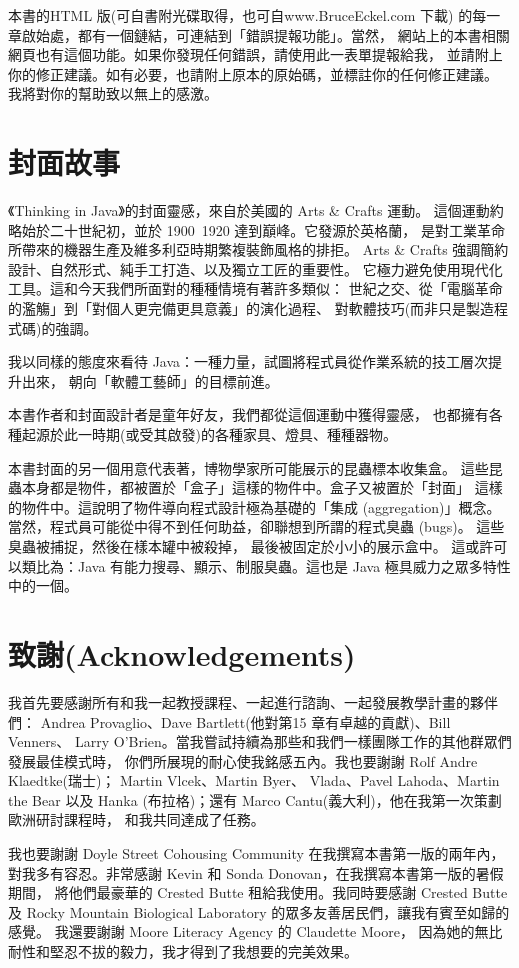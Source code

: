 本書的HTML 版(可自書附光碟取得，也可自www.BruceEckel.com 下載)
的每一章啟始處，都有一個鏈結，可連結到「錯誤提報功能」。當然，
網站上的本書相關網頁也有這個功能。如果你發現任何錯誤，請使用此一表單提報給我，
並請附上你的修正建議。如有必要，也請附上原本的原始碼，並標註你的任何修正建議。
我將對你的幫助致以無上的感激。

\section{封面故事}
《Thinking in Java》的封面靈感，來自於美國的 Arts \& Crafts 運動。
這個運動約略始於二十世紀初，並於 1900~1920 達到巔峰。它發源於英格蘭，
是對工業革命所帶來的機器生產及維多利亞時期繁複裝飾風格的排拒。
Arts \& Crafts 強調簡約設計、自然形式、純手工打造、以及獨立工匠的重要性。
它極力避免使用現代化工具。這和今天我們所面對的種種情境有著許多類似：
世紀之交、從「電腦革命的濫觴」到「對個人更完備更具意義」的演化過程、
對軟體技巧(而非只是製造程式碼)的強調。

我以同樣的態度來看待 Java：一種力量，試圖將程式員從作業系統的技工層次提升出來，
朝向「軟體工藝師」的目標前進。

本書作者和封面設計者是童年好友，我們都從這個運動中獲得靈感，
也都擁有各種起源於此一時期(或受其啟發)的各種家具、燈具、種種器物。

本書封面的另一個用意代表著，博物學家所可能展示的昆蟲標本收集盒。
這些昆蟲本身都是物件，都被置於「盒子」這樣的物件中。盒子又被置於「封面」
這樣的物件中。這說明了物件導向程式設計極為基礎的「集成 (aggregation)」概念。
當然，程式員可能從中得不到任何助益，卻聯想到所謂的程式臭蟲 (bugs)。
這些臭蟲被捕捉，然後在樣本罐中被殺掉， 最後被固定於小小的展示盒中。
這或許可以類比為：Java 有能力搜尋、顯示、制服臭蟲。這也是
Java 極具威力之眾多特性中的一個。


\section{致謝(Acknowledgements)}
我首先要感謝所有和我一起教授課程、一起進行諮詢、一起發展教學計畫的夥伴們：
Andrea Provaglio、Dave Bartlett(他對第15 章有卓越的貢獻)、Bill Venners、
Larry O'Brien。當我嘗試持續為那些和我們一樣團隊工作的其他群眾們發展最佳模式時，
你們所展現的耐心使我銘感五內。我也要謝謝 Rolf Andre Klaedtke(瑞士)；
Martin Vlcek、Martin Byer、 Vlada、Pavel Lahoda、Martin the Bear 以及 Hanka
(布拉格)；還有 Marco Cantu(義大利)，他在我第一次策劃歐洲研討課程時，
和我共同達成了任務。

我也要謝謝 Doyle Street Cohousing Community 在我撰寫本書第一版的兩年內，
對我多有容忍。非常感謝 Kevin 和 Sonda Donovan，在我撰寫本書第一版的暑假期間，
將他們最豪華的 Crested Butte 租給我使用。我同時要感謝 Crested Butte 及
Rocky Mountain Biological Laboratory 的眾多友善居民們，讓我有賓至如歸的感覺。
我還要謝謝 Moore Literacy Agency 的 Claudette Moore，
因為她的無比耐性和堅忍不拔的毅力，我才得到了我想要的完美效果。

